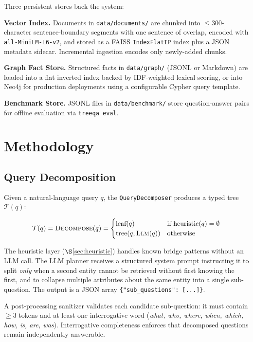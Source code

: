 \documentclass[conference]{IEEEtran}
\begin{document}
Three persistent stores back the system:

\textbf{Vector Index.} Documents in \texttt{data/documents/} are
chunked into $\leq 300$-character sentence-boundary segments with one
sentence of overlap, encoded with \texttt{all-MiniLM-L6-v2}, and stored
as a FAISS \texttt{IndexFlatIP} index plus a JSON metadata sidecar.
Incremental ingestion encodes only newly-added chunks.

\textbf{Graph Fact Store.} Structured facts in \texttt{data/graph/}
(JSONL or Markdown) are loaded into a flat inverted index backed by
IDF-weighted lexical scoring, or into Neo4j for production deployments
using a configurable Cypher query template.

\textbf{Benchmark Store.} JSONL files in \texttt{data/benchmark/}
store question-answer pairs for offline evaluation via \texttt{treeqa eval}.

\section{Methodology}
\label{sec:method}

\subsection{Query Decomposition}
\label{sec:decomp}

Given a natural-language query $q$, the \texttt{QueryDecomposer}
produces a typed tree $\mathcal{T}(q)$:

\begin{equation}
  \mathcal{T}(q) = \textsc{Decompose}(q) =
  \begin{cases}
    \text{leaf}(q)               & \text{if heuristic}(q) = \emptyset \\
    \text{tree}(q, \textsc{Llm}(q)) & \text{otherwise}
  \end{cases}
  \label{eq:decompose}
\end{equation}

The heuristic layer ($\S$\ref{sec:heuristic}) handles known bridge
patterns without an LLM call.  The LLM planner receives a structured
system prompt instructing it to split \emph{only} when a second entity
cannot be retrieved without first knowing the first, and to collapse
multiple attributes about the same entity into a single sub-question.
The output is a JSON array \texttt{\{"sub\_questions": [...]\}}.

A post-processing sanitizer validates each candidate sub-question:
it must contain $\geq 3$ tokens and at least one interrogative word
(\textit{what, who, where, when, which, how, is, are, was}).
Interrogative completeness enforces that decomposed questions remain
independently answerable.
\end{document}
